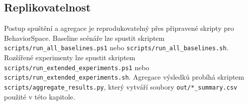 \documentclass{article}
\begin{document}
\subsection{Replikovatelnost}

Postup spuštění a agregace je reprodukovatelný přes připravené skripty pro
BehaviorSpace.
Baseline scénáře lze spustit skriptem \texttt{scripts/run\_all\_baselines.ps1}
nebo \texttt{scripts/run\_all\_baselines.sh}. Rozšířené experimenty lze spustit
skriptem \texttt{scripts/run\_extended\_experiments.ps1} nebo
\texttt{scripts/run\_extended\_experiments.sh}. Agregace výsledků probíhá
skriptem \texttt{scripts/aggregate\_results.py}, který vytváří soubory
\texttt{out/*\_summary.csv} použité v této kapitole.
\end{document}
